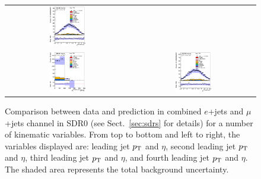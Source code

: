 \begin{figure}[htbp]
\begin{center}
\begin{tabular}{cc}
\includegraphics[width=0.30\textwidth]{appendices/figures/sdrs/JetEta3_ELEMUONCR0_1W_NOMINAL.eps} \\
\includegraphics[width=0.30\textwidth]{appendices/figures/sdrs/JetPt4_ELEMUONCR0_1W_NOMINAL.eps}  &
\includegraphics[width=0.30\textwidth]{appendices/figures/sdrs/JetEta4_ELEMUONCR0_1W_NOMINAL.eps}  \\
\end{tabular}\caption{\small {Comparison between data and prediction in combined $e$+jets and $\mu$+jets channel in SDR0 (see Sect.~\ref{sec:sdrs} for details) 
for a number of kinematic variables. From top to bottom and left to right, the variables displayed are: leading jet $\pt$ and $\eta$,  second leading jet $\pt$ and $\eta$,
third leading jet $\pt$ and $\eta$, and fourth leading jet $\pt$ and $\eta$. The shaded area represents the total background uncertainty.}}
\label{fig:ELEMUONCR0_2}
\end{center}
\end{figure}                                                                             


